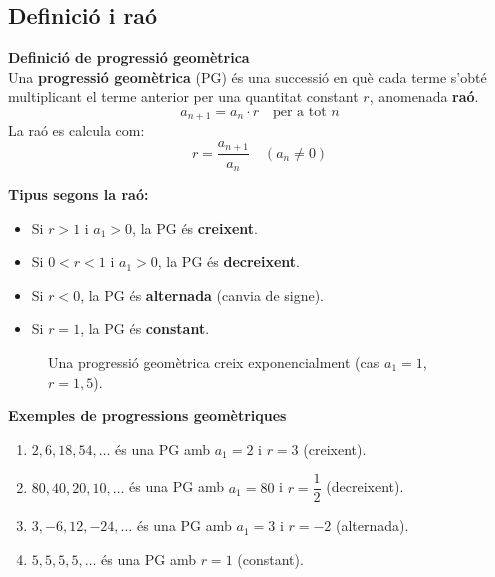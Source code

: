\documentclass[12pt]{article}
\begin{document}
\subsection{Definició i raó}

\begin{concept}
\textbf{Definició de progressió geomètrica}\\
Una \textbf{progressió geomètrica} (PG) és una successió en què cada terme s'obté multiplicant el terme anterior per una quantitat constant $r$, anomenada \textbf{raó}.
\[
a_{n+1} = a_n \cdot r \quad \text{per a tot } n
\]
La raó es calcula com:
\[
r = \dfrac{a_{n+1}}{a_n} \quad (a_n \neq 0)
\]

\textbf{Tipus segons la raó:}
\begin{itemize}
    \item Si $r > 1$ i $a_1 > 0$, la PG és \textbf{creixent}.
    \item Si $0 < r < 1$ i $a_1 > 0$, la PG és \textbf{decreixent}.
    \item Si $r < 0$, la PG és \textbf{alternada} (canvia de signe).
    \item Si $r = 1$, la PG és \textbf{constant}.
\end{itemize}
\end{concept}

\begin{figure}[H]
\centering
{}
\caption{Una progressió geomètrica creix exponencialment (cas $a_1 = 1$, $r = 1{,}5$).}
\end{figure}

\begin{exemple}
\textbf{Exemples de progressions geomètriques}
\begin{enumerate}[label=\alph*)]
    \item $2, 6, 18, 54, \dots$ és una PG amb $a_1 = 2$ i $r = 3$ (creixent).
    \item $80, 40, 20, 10, \dots$ és una PG amb $a_1 = 80$ i $r = \dfrac{1}{2}$ (decreixent).
    \item $3, -6, 12, -24, \dots$ és una PG amb $a_1 = 3$ i $r = -2$ (alternada).
    \item $5, 5, 5, 5, \dots$ és una PG amb $r = 1$ (constant).
\end{enumerate}
\end{exemple}
\end{document}
